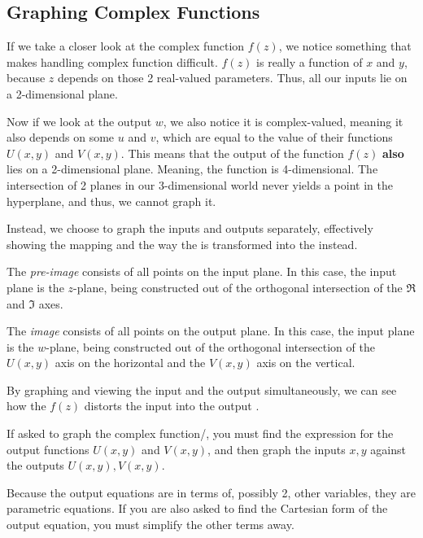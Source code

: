 \subsection{Graphing Complex Functions}\label{subsubsec:Graphing_Complex_Functions}
If we take a closer look at the complex function $f(z)$, we notice something that makes handling complex function difficult.
$f(z)$ is really a function of $x$ and $y$, because $z$ depends on those 2 real-valued parameters.
Thus, all our inputs lie on a 2-dimensional plane.

Now if we look at the output $w$, we also notice it is complex-valued, meaning it also depends on some $u$ and $v$, which are equal to the value of their functions $U(x, y)$ and $V(x, y)$.
This means that the output of the function $f(z)$ \textbf{also} lies on a 2-dimensional plane.
Meaning, the function is 4-dimensional.
The intersection of 2 planes in our 3-dimensional world never yields a point in the hyperplane, and thus, we cannot graph it.

Instead, we choose to graph the inputs and outputs separately, effectively showing the mapping and the way the  is transformed into the  instead.

\begin{definition}\label{def:Pre_Image}
  The \emph{pre-image} consists of all points on the input plane.
  In this case, the input plane is the $z$-plane, being constructed out of the orthogonal intersection of the $\Re$ and $\Im$ axes.
\end{definition}

\begin{definition}[Image]\label{def:Image}
  The \emph{image} consists of all points on the output plane.
  In this case, the input plane is the $w$-plane, being constructed out of the orthogonal intersection of the $U(x, y)$ axis on the horizontal and the $V(x, y)$ axis on the vertical.
\end{definition}

By graphing and viewing the input and the output simultaneously, we can see how the  $f(z)$ distorts the input  into the output .

If asked to graph the complex function/, you must find the expression for the output functions $U(x, y)$ and $V(x, y)$, and then graph the inputs $x, y$ against the outputs $U(x, y), V(x, y)$.

Because the output equations are in terms of, possibly 2, other variables, they are parametric equations.
If you are also asked to find the Cartesian form of the output equation, you must simplify the other terms away.

